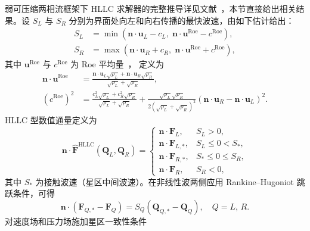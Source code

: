 \documentclass[12pt,a4paper]{article}
\numberwithin{equation}{section}    %
\begin{document}
弱可压缩两相流框架下 HLLC 求解器的完整推导详见文献~\cite{zhang2025positivity}，本节直接给出相关结果。设 $S_L$ 与 $S_R$ 分别为界面处向左和向右传播的最快波速，由如下估计给出：
\begin{equation}
    \begin{aligned}
        S_L &= \min\!\left(\bm{n} \cdot \bm{u}_L - c_L,\;
    \bm{n} \cdot \bm{u}^{\mathrm{Roe}} - c^{\mathrm{Roe}}\right),\\ 
    S_R &= \max\!\left(\bm{n} \cdot \bm{u}_R + c_R,\;
    \bm{n} \cdot \bm{u}^{\mathrm{Roe}} + c^{\mathrm{Roe}}\right),
    \end{aligned}
\end{equation}
其中 $\bm{u}^{\mathrm{Roe}}$ 与 $c^{\mathrm{Roe}}$ 为 Roe 平均量~\cite{einfeldt1988godunov}，
定义为
\begin{equation}
    \begin{aligned}
        \bm{n} \cdot \bm{u}^{\mathrm{Roe}}
    &= \frac{\bm{n} \cdot \bm{u}_L \sqrt{\rho_L}
    + \bm{n} \cdot \bm{u}_R \sqrt{\rho_R}}
    {\sqrt{\rho_L} + \sqrt{\rho_R}},\\
    \left(c^{\mathrm{Roe}}\right)^2
    &= \frac{c_L^2 \sqrt{\rho_L} + c_R^2 \sqrt{\rho_R}}
    {\sqrt{\rho_L} + \sqrt{\rho_R}}
    + \frac{\sqrt{\rho_L}\sqrt{\rho_R}}
    {2\left(\sqrt{\rho_L} + \sqrt{\rho_R}\right)^2}
    \left(\bm{n} \cdot \bm{u}_R - \bm{n} \cdot \bm{u}_L\right)^2.
    \end{aligned}
\end{equation}
HLLC 型数值通量定义为
\begin{equation}
    \label{eq:hllc_flux}
    \bm{n} \cdot \hat{\bm{F}}^{\mathrm{HLLC}}(\bm{Q}_L, \bm{Q}_R) =
    \begin{cases}
        \bm{n} \cdot \bm{F}_L,      & S_L > 0,                              \\
        \bm{n} \cdot \bm{F}_{L,*},  & S_L \leqslant 0 < S_*,               \\
        \bm{n} \cdot \bm{F}_{R,*},  & S_* \leqslant 0 \leqslant S_R,       \\
        \bm{n} \cdot \bm{F}_R,      & S_R < 0,
    \end{cases}
\end{equation}
其中 $S_*$ 为接触波速（星区中间波速）。在非线性波两侧应用 Rankine--Hugoniot 跳跃条件，可得
\begin{equation}
    \label{eq:rh}
    \bm{n} \cdot (\bm{F}_{Q,*} - \bm{F}_Q) = S_Q(\bm{Q}_{Q,*} - \bm{Q}_Q),
    \quad Q = L,\, R.
\end{equation}
对速度场和压力场施加星区一致性条件
\end{document}
